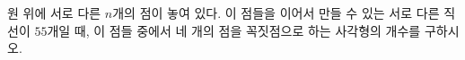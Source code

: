 \hspace*{2mm}\begin{minipage}[t]{\dimexpr\linewidth-2mm\relax}\vspace{0pt}
원 위에 서로 다른 $n$개의 점이 놓여 있다. 이 점들을 이어서 만들 수 있는 서로 다른 직선이 $55$개일 때, 이 점들 중에서 네 개의 점을 꼭짓점으로 하는 사각형의 개수를 구하시오.\end{minipage}
